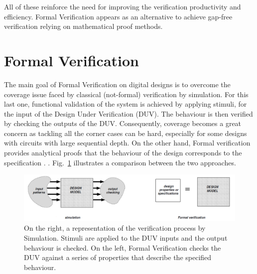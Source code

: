 All of these reinforce the need for improving the verification productivity and efficiency. Formal Verification appears as an alternative to achieve gap-free verification relying on mathematical proof methods. 
\section{Formal Verification}

The main goal of Formal Verification on digital designs is to overcome the coverage issue faced by classical (not-formal) verification by simulation. For this last one, functional validation of the system is achieved by applying stimuli,  for the input of the Design Under Verification (DUV). The behaviour is then verified by checking the outputs of the DUV. Consequently, coverage becomes a great concern as tackling all the corner cases can be hard, especially for some designs with circuits with  large sequential depth. On the other hand, Formal verification provides analytical proofs that the behaviour of the design corresponds to the specification .  \cite{thesis-formal}. Fig.~\ref{fig:sim-vs-formal} illustrates a comparison between the two approaches.

\begin{figure}[htb!]
	\centering
	\includegraphics[width=\textwidth]{images/sim_vs_formal.PNG}
	\caption{On the right, a representation of the verification process by Simulation. Stimuli are applied to the DUV inputs and the output behaviour is checked. On the left, Formal Verification checks the DUV against a series of properties that describe the specified behaviour. \cite{thesis-formal}} 
	\label{fig:sim-vs-formal}
\end{figure}

